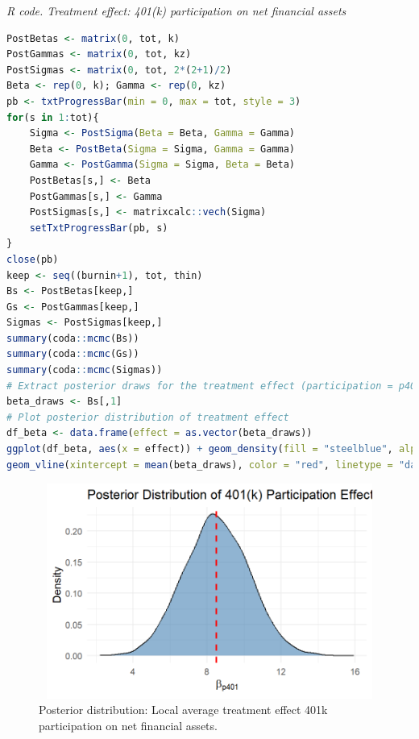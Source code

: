 \begin{tcolorbox}[enhanced,width=4.67in,center upper,
	fontupper=\large\bfseries,drop shadow southwest,sharp corners]\label{code3_chap12}
	\textit{R code. Treatment effect: 401(k) participation on net financial assets}
	\begin{VF}
		\begin{lstlisting}[language=R]		
PostBetas <- matrix(0, tot, k)
PostGammas <- matrix(0, tot, kz)
PostSigmas <- matrix(0, tot, 2*(2+1)/2)
Beta <- rep(0, k); Gamma <- rep(0, kz)
pb <- txtProgressBar(min = 0, max = tot, style = 3)
for(s in 1:tot){
	Sigma <- PostSigma(Beta = Beta, Gamma = Gamma)
	Beta <- PostBeta(Sigma = Sigma, Gamma = Gamma)
	Gamma <- PostGamma(Sigma = Sigma, Beta = Beta)
	PostBetas[s,] <- Beta
	PostGammas[s,] <- Gamma
	PostSigmas[s,] <- matrixcalc::vech(Sigma)
	setTxtProgressBar(pb, s)
}
close(pb)
keep <- seq((burnin+1), tot, thin)
Bs <- PostBetas[keep,]
Gs <- PostGammas[keep,]
Sigmas <- PostSigmas[keep,]
summary(coda::mcmc(Bs))
summary(coda::mcmc(Gs))
summary(coda::mcmc(Sigmas))
# Extract posterior draws for the treatment effect (participation = p401)
beta_draws <- Bs[,1]
# Plot posterior distribution of treatment effect
df_beta <- data.frame(effect = as.vector(beta_draws))
ggplot(df_beta, aes(x = effect)) + geom_density(fill = "steelblue", alpha = 0.6) +
geom_vline(xintercept = mean(beta_draws), color = "red", linetype = "dashed", linewidth = 1) + labs( title = "Posterior Distribution of 401(k) Participation Effect", x = expression(beta["p401"]), y = "Density") + theme_minimal(base_size = 14)
\end{lstlisting}
	\end{VF}
\end{tcolorbox}  
 
\begin{figure}[h!]
	\includegraphics[width=340pt, height=200pt]{Chapters/chapter12/figures/FigP401k.png}
	\caption[List of figure caption goes here]{Posterior distribution: Local average treatment effect 401k participation on net financial assets.}\label{fig12_3}
\end{figure}

